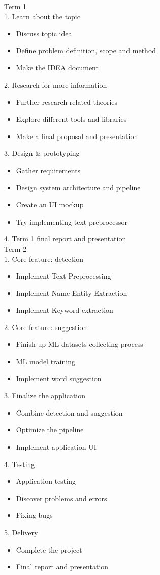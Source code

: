 \documentclass[12pt,oneside,openright,a4paper]{cpe-english-project}
\begin{document}
Term 1\\
1. Learn about the topic
\begin{itemize}
\item Discuss topic idea
\item Define problem definition, scope and method
\item Make the IDEA document
\end{itemize}
2. Research for more information
\begin{itemize}
\item Further research related theories
\item Explore different tools and libraries
\item Make a final proposal and presentation   
\end{itemize} 
3. Design \& prototyping
\begin{itemize}
\item Gather requirements
\item Design system architecture and pipeline
\item Create an UI mockup
\item Try implementing text preprocessor
\end{itemize}
4. Term 1 final report and presentation\\


Term 2\\
1. Core feature: detection
\begin{itemize}
\item Implement Text Preprocessing
\item Implement Name Entity Extraction
\item Implement Keyword extraction
\end{itemize}
2. Core feature: suggestion
\begin{itemize}
\item Finish up ML datasets collecting process
\item ML model training
\item Implement word suggestion
\end{itemize}
3. Finalize the application
\begin{itemize}
\item Combine detection and suggestion
\item Optimize the pipeline
\item Implement application UI
\end{itemize}
4. Testing
\begin{itemize}
\item Application testing
\item Discover problems and errors
\item Fixing bugs
\end{itemize}
5. Delivery
\begin{itemize}
\item Complete the project
\item Final report and presentation
\end{itemize}
\end{document}
